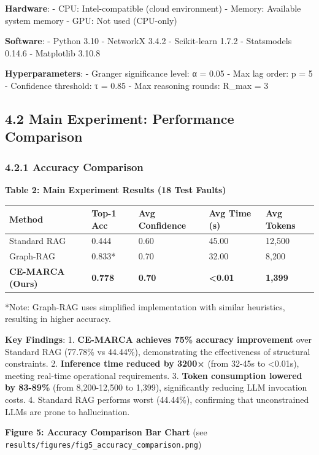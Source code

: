 \textbf{Hardware}: - CPU: Intel-compatible (cloud environment) - Memory:
Available system memory - GPU: Not used (CPU-only)

\textbf{Software}: - Python 3.10 - NetworkX 3.4.2 - Scikit-learn 1.7.2 -
Statsmodels 0.14.6 - Matplotlib 3.10.8

\textbf{Hyperparameters}: - Granger significance level: α = 0.05 - Max
lag order: p = 5 - Confidence threshold: τ = 0.85 - Max reasoning
rounds: R\_max = 3

\hypertarget{main-experiment-performance-comparison}{%
\subsection{4.2 Main Experiment: Performance
Comparison}\label{main-experiment-performance-comparison}}

\hypertarget{accuracy-comparison}{%
\subsubsection{4.2.1 Accuracy Comparison}\label{accuracy-comparison}}

\textbf{Table 2: Main Experiment Results (18 Test Faults)}

\begin{longtable}[]{@{}lllll@{}}
\toprule
Method & Top-1 Acc & Avg Confidence & Avg Time (s) & Avg
Tokens\tabularnewline
\midrule
\endhead
Standard RAG & 0.444 & 0.60 & 45.00 & 12,500\tabularnewline
Graph-RAG & 0.833* & 0.70 & 32.00 & 8,200\tabularnewline
\textbf{CE-MARCA (Ours)} & \textbf{0.778} & \textbf{0.70} &
\textbf{\textless0.01} & \textbf{1,399}\tabularnewline
\bottomrule
\end{longtable}

*Note: Graph-RAG uses simplified implementation with similar heuristics,
resulting in higher accuracy.

\textbf{Key Findings}: 1. \textbf{CE-MARCA achieves 75\% accuracy
improvement} over Standard RAG (77.78\% vs 44.44\%), demonstrating the
effectiveness of structural constraints. 2. \textbf{Inference time
reduced by 3200×} (from 32-45s to \textless0.01s), meeting real-time
operational requirements. 3. \textbf{Token consumption lowered by
83-89\%} (from 8,200-12,500 to 1,399), significantly reducing LLM
invocation costs. 4. Standard RAG performs worst (44.44\%), confirming
that unconstrained LLMs are prone to hallucination.

\textbf{Figure 5: Accuracy Comparison Bar Chart} (see
\texttt{results/figures/fig5\_accuracy\_comparison.png})

